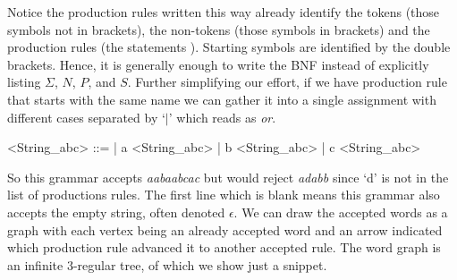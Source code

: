 Notice the production rules written this way already identify the 
tokens (those symbols not in brackets), the non-tokens (those symbols 
in brackets) and the production rules (the statements ).
Starting symbols are identified by the double brackets.  Hence,
it is generally enough to write the BNF instead of explicitly 
listing $\Sigma$, $N$, $P$, and $S$.  Further simplifying our effort,
if we have production rule that starts with the same name we 
can gather it into a single assignment with different cases 
separated by `$\mid$' which reads as \emph{or}.
\begin{center}
\begin{Gcode}[]
<String_abc> ::=  
               | a <String_abc> 
               | b <String_abc>
               | c <String_abc> 
\end{Gcode}
\end{center}
So this grammar accepts \emph{aabaabcac} 
but would reject \emph{adabb} since `d' is not in the list of productions 
rules.  The first line which is blank means this grammar also accepts the 
empty string, often denoted 
$\epsilon$.  We can draw the accepted words as a graph with each vertex 
being an already accepted word and an arrow indicated which production rule 
advanced it to another accepted rule.  The word graph is an infinite 
3-regular tree, of which we show just a snippet.
\begin{center}
\end{center}
